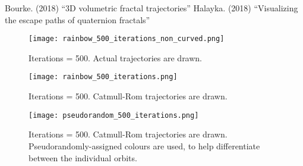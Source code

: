 \documentclass[12pt]{article}
\begin{document}
\begin{thebibliography}{9}
 Bourke. (2018) ``3D volumetric fractal trajectories''
 Halayka. (2018) ``Visualizing the escape paths of quaternion fractals''
\end{thebibliography}



\pagebreak




\begin{figure} 
\centering
  \texttt{[image: rainbow\_500\_iterations\_non\_curved.png]}	
  \caption{Iterations = 500. Actual trajectories are drawn.}
\end{figure}

\begin{figure} 
\centering
  \texttt{[image: rainbow\_500\_iterations.png]}	
  \caption{Iterations = 500. Catmull-Rom trajectories are drawn.}
\end{figure}

\begin{figure} 
\centering
  \texttt{[image: pseudorandom\_500\_iterations.png]}	
  \caption{
Iterations = 500. 
Catmull-Rom trajectories are drawn.
Pseudorandomly-assigned colours are used, to help differentiate between the individual orbits.}
\end{figure}
\end{document}
